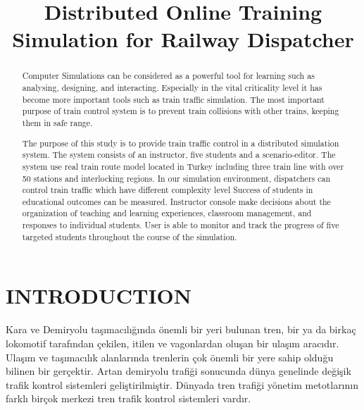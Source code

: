 \documentclass[conference]{IEEEtran}
\begin{document}
\title{Distributed Online Training Simulation for Railway Dispatcher }



\author{
}

\maketitle

\begin{abstract}
Computer Simulations can be considered as a powerful tool for learning such as analysing, designing, and interacting. Especially in the vital criticality level it has become more important tools such as train traffic simulation.
The most important purpose of train control system is to prevent train collisions with other trains, keeping them in safe range.

The purpose of this study is to provide train traffic control in a distributed simulation system. The system consists of an instructor, five students and a scenario-editor. The system use real train route model located in Turkey including three train line with over 50 stations and interlocking regions.  In our simulation environment, dispatchers can control train traffic which have different  complexity level Success of students in educational outcomes can be measured. Instructor console make decisions about the organization of teaching and learning experiences, classroom management, and responses to individual students. User is able to monitor and track the progress of five targeted students throughout the course of the simulation.

\end{abstract}

\section{INTRODUCTION}
Kara ve Demiryolu taşımacılığında önemli bir yeri bulunan tren, bir ya da birkaç lokomotif tarafından çekilen, itilen ve vagonlardan oluşan bir ulaşım aracıdır. Ulaşım ve taşımacılık alanlarında trenlerin çok önemli bir yere sahip olduğu bilinen bir gerçektir. 
Artan demiryolu trafiği sonucunda dünya genelinde değişik trafik kontrol sistemleri geliştirilmiştir. Dünyada tren trafiği yönetim metotlarının farklı birçok merkezi tren trafik kontrol sistemleri vardır.
\end{document}
